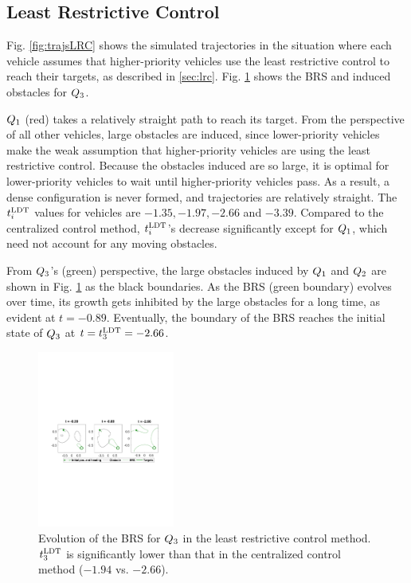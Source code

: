 \subsection{Least Restrictive Control}
Fig. \ref{fig:trajsLRC} shows the simulated trajectories in the situation where each vehicle assumes that higher-priority vehicles use the least restrictive control to reach their targets, as described in \ref{sec:lrc}. Fig. \ref{fig:lrc_rs3} shows the BRS and induced obstacles for $Q_3$.

$Q_1$ (red) takes a relatively straight path to reach its target. From the perspective of all other vehicles, large obstacles are induced, since lower-priority vehicles make the weak assumption that higher-priority vehicles are using the least restrictive control. Because the obstacles induced are so large, it is optimal for lower-priority vehicles to wait until higher-priority vehicles pass. As a result, a dense configuration is never formed, and trajectories are relatively straight. The $t^\text{LDT}_i$ values for vehicles are $-1.35, -1.97, -2.66$ and $-3.39$. Compared to the centralized control method, $t^\text{LDT}_i$'s decrease significantly except for $Q_1$, which need not account for any moving obstacles. 

From $Q_3$'s (green) perspective, the large obstacles induced by $Q_1$ and $Q_2$ are shown in Fig. \ref{fig:lrc_rs3} as the black boundaries. As the BRS (green boundary) evolves over time, its growth gets inhibited by the large obstacles for a long time, as evident at $t=-0.89$. Eventually, the boundary of the BRS reaches the initial state of $Q_3$ at $t = t^\text{LDT}_3 = -2.66$.
%
%
\begin{figure}[H]
  \centering
  \includegraphics[width=0.4\textwidth]{"fig/lrc_rs3"}
  \caption{Evolution of the BRS for $Q_3$ in the least restrictive control method. $t^\text{LDT}_3$ is significantly lower than that in the centralized control method ($-1.94$ vs. $-2.66$).}
  \label{fig:lrc_rs3}
    \vspace{-1em}
\end{figure}